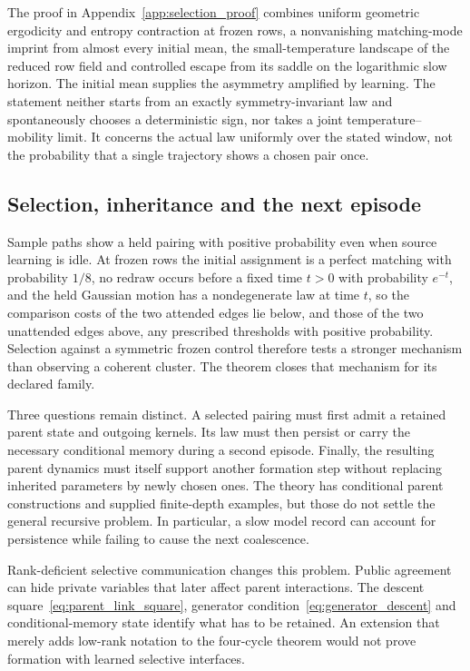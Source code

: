 The proof in Appendix~\ref{app:selection_proof} combines uniform geometric ergodicity and entropy contraction at frozen rows, a nonvanishing matching-mode imprint from almost every initial mean, the small-temperature landscape of the reduced row field and controlled escape from its saddle on the logarithmic slow horizon. The initial mean supplies the asymmetry amplified by learning. The statement neither starts from an exactly symmetry-invariant law and spontaneously chooses a deterministic sign, nor takes a joint temperature--mobility limit. It concerns the actual law uniformly over the stated window, not the probability that a single trajectory shows a chosen pair once.

\subsection{Selection, inheritance and the next episode}
Sample paths show a held pairing with positive probability even when source learning is idle. At frozen rows the initial assignment is a perfect matching with probability $1/8$, no redraw occurs before a fixed time $t>0$ with probability $e^{-t}$, and the held Gaussian motion has a nondegenerate law at time $t$, so the comparison costs of the two attended edges lie below, and those of the two unattended edges above, any prescribed thresholds with positive probability. Selection against a symmetric frozen control therefore tests a stronger mechanism than observing a coherent cluster. The theorem closes that mechanism for its declared family.

Three questions remain distinct. A selected pairing must first admit a retained parent state and outgoing kernels. Its law must then persist or carry the necessary conditional memory during a second episode. Finally, the resulting parent dynamics must itself support another formation step without replacing inherited parameters by newly chosen ones. The theory has conditional parent constructions and supplied finite-depth examples, but those do not settle the general recursive problem. In particular, a slow model record can account for persistence while failing to cause the next coalescence.

Rank-deficient selective communication changes this problem. Public agreement can hide private variables that later affect parent interactions. The descent square~\eqref{eq:parent_link_square}, generator condition~\eqref{eq:generator_descent} and conditional-memory state identify what has to be retained. An extension that merely adds low-rank notation to the four-cycle theorem would not prove formation with learned selective interfaces.

